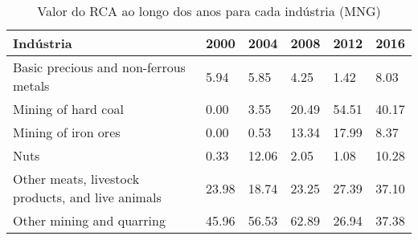 \begin{table}
\centering
\caption{Valor do RCA ao longo dos anos para cada indústria (MNG)}
\label{tab:ex3-tempo-MNG}
\begin{tabular}{p{6cm}p{1.5cm}p{1.5cm}p{1.5cm}p{1.5cm}p{1.5cm}}
\toprule
                                        Indústria &  2000 &  2004 &  2008 &  2012 &  2016 \\
\midrule
            Basic precious and non-ferrous metals &  5.94 &  5.85 &  4.25 &  1.42 &  8.03 \\
                              Mining of hard coal &  0.00 &  3.55 & 20.49 & 54.51 & 40.17 \\
                              Mining of iron ores &  0.00 &  0.53 & 13.34 & 17.99 &  8.37 \\
                                             Nuts &  0.33 & 12.06 &  2.05 &  1.08 & 10.28 \\
Other meats, livestock products, and live animals & 23.98 & 18.74 & 23.25 & 27.39 & 37.10 \\
                        Other mining and quarring & 45.96 & 56.53 & 62.89 & 26.94 & 37.38 \\
\bottomrule
\end{tabular}
\end{table}
